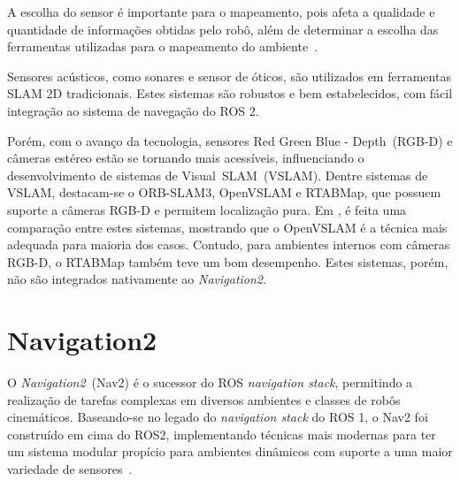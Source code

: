 \documentclass[repeatfields,xlists,xpacks,oneside,yearsonly]{ufrgscca}
\begin{document}
A escolha do sensor é importante para o mapeamento,
pois afeta a qualidade e quantidade de informações obtidas pelo robô, além
de determinar a escolha das ferramentas utilizadas para o mapeamento do
ambiente~\cite{SensorAndSLAM}.

Sensores acústicos, como sonares e sensor de óticos, são utilizados
em ferramentas SLAM 2D tradicionais. Estes sistemas são robustos e bem estabelecidos,
com fácil integração ao sistema de navegação do ROS 2.

Porém, com o avanço da tecnologia, sensores Red Green Blue - Depth~(RGB-D)
e câmeras estéreo estão se tornando mais acessíveis, influenciando o
desenvolvimento de sistemas de Visual~SLAM~(VSLAM).
Dentre sistemas de VSLAM, destacam-se o ORB-SLAM3, OpenVSLAM e RTABMap, que possuem suporte
a câmeras RGB-D e permitem localização pura.
Em \textcite{VSLAM}, é feita uma comparação entre estes sistemas, mostrando que o
OpenVSLAM é a técnica mais adequada para maioria dos casos.
Contudo, para ambientes internos com câmeras RGB-D, o RTABMap também teve um bom desempenho.
Estes sistemas, porém, não são integrados nativamente ao \textit{Navigation2}.


\section{Navigation2}

O \textit{Navigation2}~(Nav2) é o sucessor do ROS \textit{navigation stack}, permitindo
a realização de tarefas complexas em diversos ambientes e classes de robôs cinemáticos.
Baseando-se no legado do \textit{navigation stack} do ROS 1, o Nav2 foi construído em cima
do ROS2, implementando técnicas mais modernas para ter um sistema modular propício para
ambientes dinâmicos com suporte a uma maior variedade de sensores~\cite{Nav2}.
\end{document}
